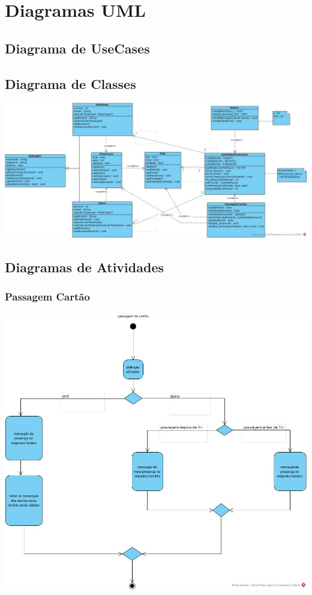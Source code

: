 \documentclass[11pt]{article}   %
\begin{document}
\newpage

\section{Diagramas UML}

\subsection{Diagrama de UseCases}

\subsection{Diagrama de Classes}
    \includegraphics[width=\textwidth]{images/diagrama_classes.png}

\subsection{Diagramas de Atividades}

\subsubsection{Passagem Cartão}
    \includegraphics[width=\textwidth]{images/diagrama_atividades_cartao.png}
\end{document}
